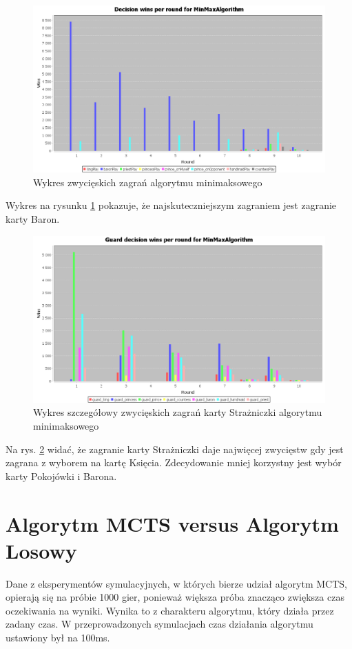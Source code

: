 \begin{figure}[H]
	\centering
	\includegraphics[width=\textwidth]{Resources/MmVsR/MmVsRdecision.PNG}
	\caption{Wykres zwycięskich zagrań algorytmu minimaksowego} 
	\label{fig:MmVsRdecision}
\end{figure} 

Wykres na rysunku \ref{fig:MmVsRdecision} pokazuje, że najskuteczniejszym zagraniem jest zagranie karty Baron. 

\begin{figure}[H]
	\centering
	\includegraphics[width=\textwidth]{Resources/MmVsR/MmVsRguarddecision.PNG}
	\caption{Wykres szczegółowy zwycięskich zagrań karty Strażniczki algorytmu minimaksowego} 
	\label{fig:MmVsRguarddecision}
\end{figure}

Na rys. \ref{fig:MmVsRguarddecision} widać, że zagranie karty Strażniczki daje najwięcej zwycięstw gdy jest zagrana z wyborem na kartę Księcia. Zdecydowanie mniej korzystny jest wybór karty Pokojówki i Barona.

\clearpage
\section{Algorytm MCTS versus Algorytm Losowy}
Dane z eksperymentów symulacyjnych, w których bierze udział algorytm MCTS, opierają się na próbie 1000 gier, ponieważ większa próba znacząco zwiększa czas oczekiwania na wyniki. Wynika to z charakteru algorytmu, który działa przez zadany czas. W przeprowadzonych symulacjach czas działania algorytmu ustawiony był na 100ms.

